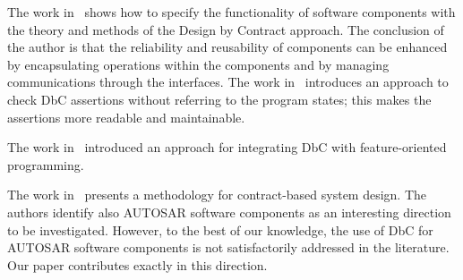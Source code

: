 The work in~\cite{ii5} shows %
how to specify the functionality of software components with the theory and methods of the Design by Contract approach. %
The conclusion of the author is that the reliability and reusability of components can be enhanced by encapsulating operations 
 within the components and by managing communications %
 through the interfaces. %
 The work in~\cite{ii4} introduces an approach %
 to %
 check DbC assertions without referring to the program states; this makes the assertions more readable and maintainable.


The work in~\cite{ii3} introduced an approach for integrating DbC with feature-oriented programming. %

The work in~\cite{ContractsSystemsDesign} presents a methodology for contract-based system design. The authors identify also AUTOSAR software components as an interesting direction to be investigated. 
However, to the best of our knowledge, the use of DbC for AUTOSAR software components is not %
satisfactorily addressed in the literature. 
Our paper contributes exactly in this direction.

